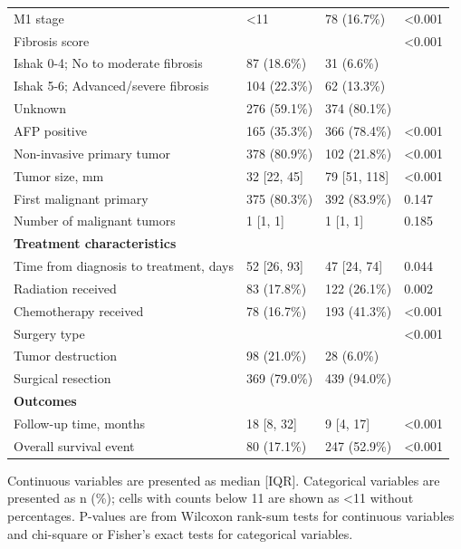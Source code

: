 \begin{table}[!htbp]
\begin{tabular}{llll}
M1 stage & \textless{}11 & 78 (16.7\%) & \textless{}0.001 \\
Fibrosis score &  &  & \textless{}0.001 \\
\hspace{1em}Ishak 0-4; No to moderate fibrosis & 87 (18.6\%) & 31 (6.6\%) &  \\
\hspace{1em}Ishak 5-6; Advanced/severe fibrosis & 104 (22.3\%) & 62 (13.3\%) &  \\
\hspace{1em}Unknown & 276 (59.1\%) & 374 (80.1\%) &  \\
AFP positive & 165 (35.3\%) & 366 (78.4\%) & \textless{}0.001 \\
Non-invasive primary tumor & 378 (80.9\%) & 102 (21.8\%) & \textless{}0.001 \\
Tumor size, mm & 32 [22, 45] & 79 [51, 118] & \textless{}0.001 \\
First malignant primary & 375 (80.3\%) & 392 (83.9\%) & 0.147 \\
Number of malignant tumors & 1 [1, 1] & 1 [1, 1] & 0.185 \\
\midrule
\multicolumn{4}{l}{\textbf{Treatment characteristics}} \\
Time from diagnosis to treatment, days & 52 [26, 93] & 47 [24, 74] & 0.044 \\
Radiation received & 83 (17.8\%) & 122 (26.1\%) & 0.002 \\
Chemotherapy received & 78 (16.7\%) & 193 (41.3\%) & \textless{}0.001 \\
Surgery type &  &  & \textless{}0.001 \\
\hspace{1em}Tumor destruction & 98 (21.0\%) & 28 (6.0\%) &  \\
\hspace{1em}Surgical resection & 369 (79.0\%) & 439 (94.0\%) &  \\
\midrule
\multicolumn{4}{l}{\textbf{Outcomes}} \\
Follow-up time, months & 18 [8, 32] & 9 [4, 17] & \textless{}0.001 \\
Overall survival event & 80 (17.1\%) & 247 (52.9\%) & \textless{}0.001 \\
\bottomrule
\end{tabular}
\begin{minipage}{0.95\linewidth}
\vspace{0.5em}
\footnotesize Continuous variables are presented as median [IQR]. Categorical variables are presented as n (\%); cells with counts below 11 are shown as <11 without percentages. P-values are from Wilcoxon rank-sum tests for continuous variables and chi-square or Fisher's exact tests for categorical variables.
\end{minipage}
\end{table}
